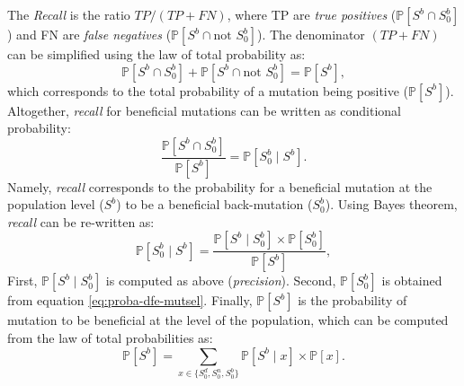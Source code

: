 \documentclass{article}
\newcommand{\proba}{\mathbb{P}}
\newcommand{\Sphy}{S_{0}}
\newcommand{\SphyDel}{\Sphy^{d}}
\newcommand{\SphyNeu}{\Sphy^{n}}
\newcommand{\SphyBen}{\Sphy^{b}}
\newcommand{\Sphyclass}{x}
\newcommand{\given}{\mid}
\newcommand{\Spop}{S}
\newcommand{\SpopBen}{\Spop^{b}}
\newcommand{\ProbaPopBen}{\proba [ \SpopBen ]}
\begin{document}
    The \textit{Recall} is the ratio $TP / (TP + FN)$, where TP are \textit{true positives} ($\proba [ \SpopBen  \cap  \SphyBen]$) and FN are \textit{false negatives} ($\proba [ \SpopBen  \cap \text{not } \SphyBen]$).
    The denominator $(TP + FN)$ can be simplified using the law of total probability as:
    \begin{equation}
        \proba [ \SpopBen  \cap  \SphyBen] + \proba [ \SpopBen \cap \text{not } \SphyBen] = \proba [ \SpopBen],
    \end{equation}
    which corresponds to the total probability of a mutation being positive ($\proba [ \SpopBen]$).
    Altogether, \textit{recall} for beneficial mutations can be written as conditional probability:
    \begin{equation}
        \frac{\proba [ \SpopBen \cap  \SphyBen]}{\proba [ \SpopBen]} = \proba [ \SphyBen  \given \SpopBen ].
    \end{equation}
    Namely, \textit{recall} corresponds to the probability for a beneficial mutation at the population level ($\SpopBen$) to be a beneficial back-mutation ($\SphyBen$).
    Using Bayes theorem, \textit{recall} can be re-written as:
    \begin{equation}
        \proba [\SphyBen \given \SpopBen] = \frac{\proba [\SpopBen \given \SphyBen] \times \proba[\SphyBen]}{\ProbaPopBen},
        \label{eq:bayes}
    \end{equation}
    First, $\proba [\SpopBen \given \SphyBen]$ is computed as above (\textit{precision}).
    Second, $\proba [ \SphyBen ]$ is obtained from equation \ref{eq:proba-dfe-mutsel}.
    Finally, $\proba [ \SpopBen ]$ is the probability of mutation to be beneficial at the level of the population, which can be computed from the law of total probabilities as:
    \begin{equation}
        \proba [ \SpopBen ] = \sum_{\Sphyclass \in \{\SphyDel, \SphyNeu, \SphyBen \} }\proba [\SpopBen \given \Sphyclass ] \times \proba [\Sphyclass ].
        \label{eq:total_proba}
    \end{equation}
    \printbibliography
\end{document}

